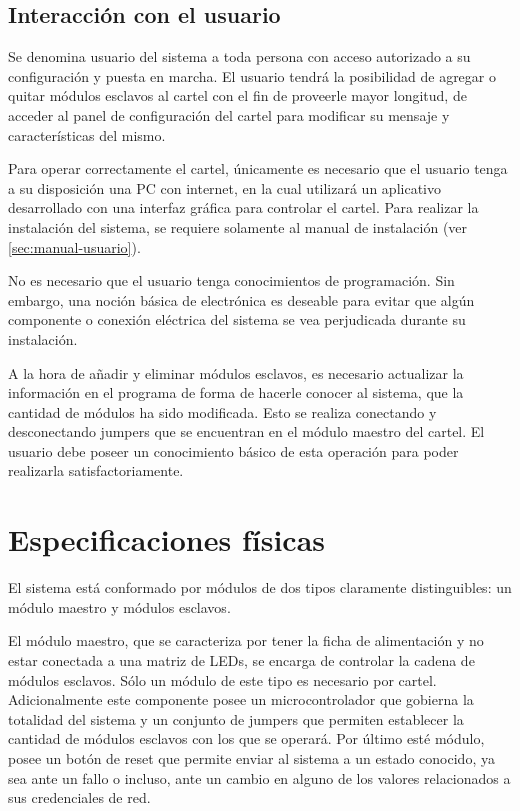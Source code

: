 \subsection{Interacción con el usuario}
	
	Se denomina usuario del sistema a toda persona con acceso autorizado a su configuración y puesta en marcha.	El usuario tendrá la posibilidad de agregar o quitar módulos esclavos al cartel con el fin de proveerle mayor longitud, de acceder al panel de configuración del cartel para modificar su mensaje y características del mismo.
	
	Para operar correctamente el cartel, únicamente es necesario que el usuario tenga a su disposición una PC con internet, en la cual utilizará un aplicativo desarrollado con una interfaz gráfica para controlar el cartel. Para realizar la instalación del sistema, se requiere solamente al manual de instalación (ver \ref{sec:manual-usuario}). %

	No es necesario que el usuario tenga conocimientos de programación.
	Sin embargo, una noción básica de electrónica es deseable para evitar que algún componente o conexión eléctrica del sistema se vea perjudicada durante su instalación.
	
	A la hora de añadir y eliminar módulos esclavos, es necesario actualizar la información en el programa de forma de hacerle conocer al sistema, que la cantidad de módulos ha sido modificada. Esto se realiza conectando y desconectando jumpers que se encuentran en el módulo maestro del cartel.
	El usuario debe poseer un conocimiento básico de esta operación para poder realizarla satisfactoriamente.
	
	

\section{Especificaciones físicas}

	El sistema está conformado por módulos de dos tipos claramente distinguibles: un módulo maestro y módulos esclavos.

	El módulo maestro, que se caracteriza por tener la ficha de alimentación y no estar conectada a una matriz de LEDs, se encarga de controlar la cadena de módulos esclavos. Sólo un módulo de este tipo es necesario por cartel.
	Adicionalmente este componente posee un microcontrolador que gobierna la totalidad del sistema y un conjunto de jumpers que permiten establecer la cantidad de módulos esclavos con los que se operará.
	Por último esté módulo, posee un botón de reset que permite enviar al sistema a un estado conocido, ya sea ante un fallo o incluso, ante un cambio en alguno de los valores relacionados a sus credenciales de red.

